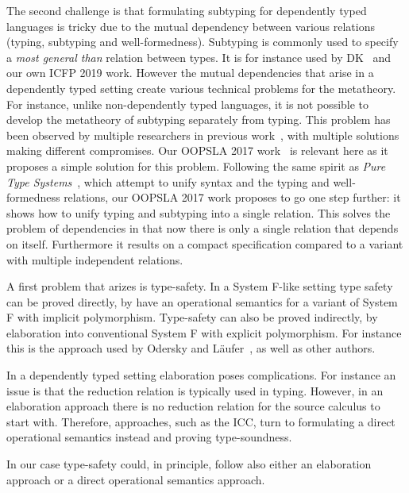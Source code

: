 The second challenge is that formulating subtyping for dependently typed
languages is tricky due to the mutual dependency between various relations
(typing, subtyping and well-formedness). Subtyping is commonly used to
specify a \emph{most general than} relation between types. It
is for instance used by DK~\cite{dunfield2013complete} and our own ICFP 2019 work.
However the mutual dependencies that arise in a dependently typed setting create
various technical problems for the metatheory.
For instance, unlike non-dependently typed languages, it is
not possible to develop the metatheory of subtyping separately from typing.
This problem has been observed by multiple researchers
in previous work~\cite{subdep,Chen03coc,hutchins,ptssub}, with multiple solutions making different compromises.
Our OOPSLA 2017 work~\cite{full} is relevant here as it proposes a simple
solution for this problem. Following the same spirit as \emph{Pure Type Systems}~\cite{BarendregtHP:intgts},
which attempt to unify syntax and the typing and well-formedness relations,
our OOPSLA 2017 work proposes to go one step further: it shows how to unify typing
and subtyping into a single relation. This solves the problem of dependencies
in that now there is only a single relation that depends on itself. Furthermore
it results on a compact specification compared to a variant with multiple
independent relations.


A first problem that arizes is type-safety.
In a System F-like setting type safety can be proved
directly, by have an operational semantics for
a variant of System F with implicit polymorphism.
Type-safety can also be proved indirectly, by elaboration
into conventional System F with explicit polymorphism.
For instance this is the approach used by Odersky and L\"aufer~\cite{odersky1996putting},
as well as other authors.

In a dependently typed setting elaboration poses
complications. For instance an issue is that the reduction
relation is typically used in typing. However, in an elaboration
approach there is no reduction relation for the source calculus
to start with. Therefore, approaches, such as the ICC, turn to
formulating a direct operational semantics instead and proving
type-soundness.

In our case type-safety could, in principle, follow also either an elaboration
approach or a direct operational semantics approach.

